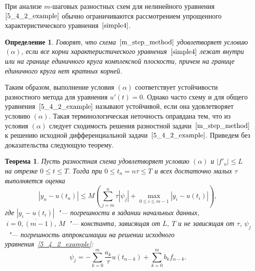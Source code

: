\documentclass[11pt,a4paper,twoside]{report}
\numberwithin{equation}{section}
\newtheorem*{definition}{Определение}
\theoremstyle{definition}
\theoremstyle{plain}
\newtheorem*{theorem*}{Теорема}
\begin{document}
При анализе $m$-шаговых разностных схем для нелинейного уравнения
$\eqref{5_4_2_example}$ обычно ограничиваются рассмотрением упрощенного
характеристического уравнения~$\eqref{simple4}$.
%
\begin{definition}
%
    Говорят, что схема~$\eqref{m_step_method}$ удовлетворяет условию $(\alpha)$,
    если все корни характеристического уравнения~$\eqref{simple4}$ лежат внутри или на границе
    единичного круга комплексной плоскости, причем на границе единичного круга
    нет кратных корней.
%
\end{definition}
%
Таким образом, выполнение условия $(\alpha)$ соответствует устойчивости
разностного метода для уравнения $u'(t)=0$. Однако часто схему и для общего
уравнения~$\eqref{5_4_2_example}$ называют устойчивой, если она удовлетворяет условию
$(\alpha)$. Такая терминологическая неточность оправдана тем, что из условия
$(\alpha)$ следует сходимость решения разностной задачи~$\eqref{m_step_method}$
к решению исходной дифференциальной задачи~$\eqref{5_4_2_example}$. Приведем без
доказательства следующую теорему.
%
\begin{theorem*}
%
    Пусть разностная схема удовлетворяет условию $(\alpha)$ и $|f'_u|\leqslant L$
    на отрезке $0 \leqslant t \leqslant T$. Тогда при $0 \leqslant t_n = n\tau
    \leqslant T$ и всех достаточно малых $\tau$ выполняется оценка
    $$
        |y_n-u(t_n)| \leqslant M\left(\sum\limits_{j=m}^n\tau|\psi_j| +
        \max_{0 \leqslant i \leqslant m-1}|y_i - u(t_i)|\right),
    $$
    где $|y_i-u(t_i)|$~"--- погрешности в задании начальных данных,
    $~i=\overline{0,(m-1)}$, $M$~"--- константа, зависящая от
    $L,~T$ и не зависящая от $\tau$, $\psi_j$~"--- погрешность аппроксимации на решении исходного
    уравнения~\eqref{5_4_2_example}:
    $$
        \psi_j = -\sum\limits_{k=0}^m\dfrac{a_k}{\tau}u(t_{n-k}) + \sum\limits_{k=0}^mb_kf_{n-k}.
    $$
%
\end{theorem*}
%
\end{document}
